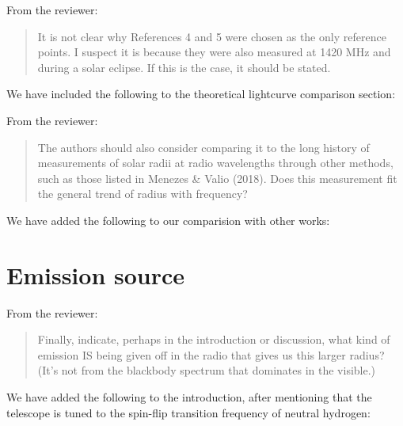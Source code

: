 \documentclass{article}
\begin{document}
From the reviewer:

\begin{quote}
  It is not clear why References 4 and 5 were chosen as the only reference points.
  I suspect it is because they were also measured at 1420 MHz and during a solar eclipse. If this is the case, it should be stated.
\end{quote}

\noindent We have included the following to the theoretical lightcurve comparison section:

\begin{quote}
  
\end{quote}

\noindent From the reviewer:

\begin{quote}
  The authors should also consider comparing it to the long history of measurements of solar radii at radio wavelengths through other methods, such as those listed in Menezes \& Valio (2018).
  Does this measurement fit the general trend of radius with frequency?
\end{quote}

\noindent We have added the following to our comparision with other works:

\begin{quote}
  
\end{quote}

\section{Emission source}

\noindent From the reviewer:

\begin{quote}
  Finally, indicate, perhaps in the introduction or discussion, what kind of emission IS being given off in the radio that gives us this larger radius? (It’s not from the blackbody spectrum that dominates in the visible.)
\end{quote}

\noindent We have added the following to the introduction, after mentioning that the telescope is tuned to the spin-flip transition frequency of neutral hydrogen:

\begin{quote}
  
\end{quote}
  




\end{document}
